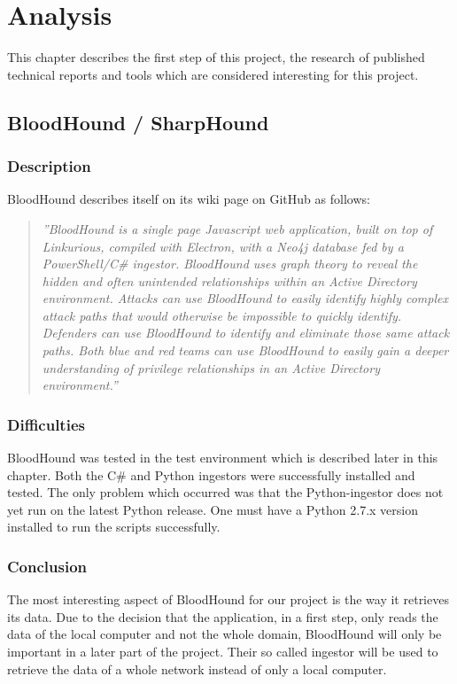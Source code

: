 \section{Analysis}
This chapter describes the first step of this project, the research of published technical reports and tools which are considered interesting for this project.
\subsection{BloodHound / SharpHound}
\subsubsection{Description}
BloodHound describes itself on its wiki page on GitHub as follows:
\begin{quotation}
    \textit{''BloodHound is a single page Javascript web application, built on top of Linkurious, compiled with Electron, with a Neo4j database fed by a PowerShell/C\# ingestor. BloodHound uses graph theory to reveal the hidden and often unintended relationships within an Active Directory environment. Attacks can use BloodHound to easily identify highly complex attack paths that would otherwise be impossible to quickly identify. Defenders can use BloodHound to identify and eliminate those same attack paths. Both blue and red teams can use BloodHound to easily gain a deeper understanding of privilege relationships in an Active Directory environment.'' \cite{blo2018}} 
\end{quotation}
\subsubsection{Difficulties}
BloodHound was tested in the test environment which is described later in this chapter. Both the C\# and Python ingestors were successfully installed and tested. The only problem which occurred was that the Python-ingestor does not yet run on the latest Python release. One must have a Python 2.7.x version installed to run the scripts successfully.

\subsubsection{Conclusion}
The most interesting aspect of BloodHound for our project is the way it retrieves its data. Due to the decision that the application, in a first step, only reads the data of the local computer and not the whole domain, BloodHound will only be important in a later part of the project. Their so called ingestor will be used to retrieve the data of a whole network instead of only a local computer.

